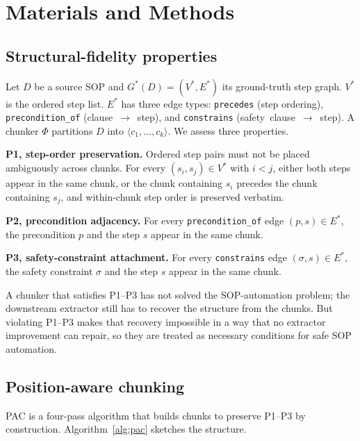\documentclass[make,article,submit,oneauthor,pdftex]{Definitions/mdpi}
\begin{document}
\section{Materials and Methods}

\subsection{Structural-fidelity properties}\label{sec:methods-properties}

Let $D$ be a source SOP and $G^{*}(D)=(V^{*},E^{*})$ its ground-truth
step graph. $V^{*}$ is the ordered step list. $E^{*}$ has three edge
types: \texttt{precedes} (step ordering), \texttt{precondition\_of}
(clause~$\rightarrow$~step), and \texttt{constrains}
(safety~clause~$\rightarrow$~step). A chunker $\Phi$ partitions $D$ into
$\langle c_{1},\dots,c_{k}\rangle$. We assess three properties.

\textbf{P1, step-order preservation.} Ordered step pairs must not be
placed ambiguously across chunks. For every $(s_i, s_j)\in V^{*}$ with
$i<j$, either both steps appear in the same chunk, or the chunk
containing $s_i$ precedes the chunk containing $s_j$, and within-chunk
step order is preserved verbatim.

\textbf{P2, precondition adjacency.} For every \texttt{precondition\_of}
edge $(p,s)\in E^{*}$, the precondition $p$ and the step $s$ appear in
the same chunk.

\textbf{P3, safety-constraint attachment.} For every
\texttt{constrains} edge $(\sigma,s)\in E^{*}$, the safety constraint
$\sigma$ and the step $s$ appear in the same chunk.

A chunker that satisfies P1--P3 has not solved the SOP-automation
problem; the downstream extractor still has to recover the structure
from the chunks. But violating P1--P3 makes that recovery impossible
in a way that no extractor improvement can repair, so they are treated
as necessary conditions for safe SOP automation.

\subsection{Position-aware chunking}

PAC is a four-pass algorithm that builds chunks to preserve P1--P3 by
construction. Algorithm~\ref{alg:pac} sketches the structure.
\end{document}
